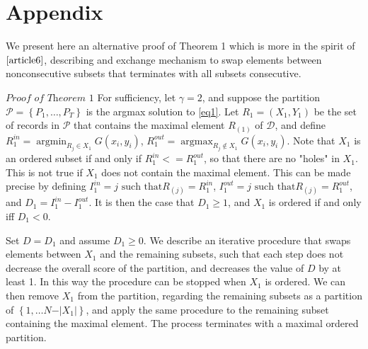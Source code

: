\documentclass{article}
\theoremstyle{case}
\DeclareMathOperator*{\argmax}{argmax} %
\DeclareMathOperator*{\argmin}{argmin} %
\begin{document}
\cleardoublepage
\appendix
\section{Appendix}
We present here an alternative proof of Theorem 1 which is more in the spirit of $\cite{article6}$, describing and exchange mechanism to swap elements between nonconsecutive subsets that terminates with all subsets consecutive.

\vspace{6pt}

$\textit{Proof of Theorem 1}$
For sufficiency, let $\gamma = 2$, and suppose the partition $\mathcal{P} = \left\lbrace P_1, \dots, P_T\right\rbrace$ is the argmax solution to \ref{eq1}. Let $R_1 = (X_1, Y_1)$ be the set of records in $\mathcal{P}$ that contains the maximal element $R_{(1)}$ of $\mathcal{D}$, and define $R_1^{in} = \argmin_{R_j \in X_1} G(x_i, y_i)$, $R_1^{out} = \argmax_{R_j \not\in X_1} G(x_i, y_i)$. Note that $X_1$ is an ordered subset if and only if $R_1^{in} <= R_1^{out}$, so that there are no "holes" in $X_1$. This is not true if $X_1$ does not contain the maximal element. This can be made precise by defining $I_1^{in} = j \text{ such that} R_{(j)} = R_1^{in}$, $I_1^{out} = j \text{ such that} R_{(j)} = R_1^{out}$, and $D_1 = I_1^{in} - I_1^{out}$. It is then the case that $D_1 \geq 1$, and $X_1$ is ordered if and only iff $D_1 < 0$.

Set $D = D_1$ and assume $D_1 \geq 0$. We describe an iterative procedure that swaps elements between $X_1$ and the remaining subsets, such that each step does not decrease the overall score of the partition, and decreases the value of $D$ by at least 1. In this way the procedure can be stopped when $X_1$ is ordered. We can then remove $X_1$ from the partition, regarding the remaining subsets as a partition of $\left\lbrace 1, \dots N-\vert X_1 \vert\right\rbrace$, and apply the same procedure to the remaining subset containing the maximal element. The process terminates with a maximal ordered partition.
\end{document}

